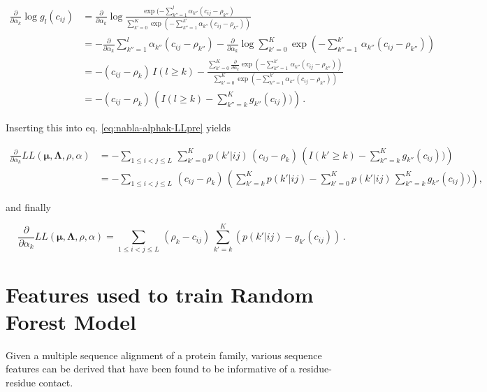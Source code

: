 \documentclass[11pt,a4paper,twoside]{book}
\newcommand{\cij}{c_{ij}}
\theoremstyle{definition}
\theoremstyle{definition}
\theoremstyle{remark}
\begin{document}
\begin{align}
    \frac{\partial} {\partial \alpha_k}  \log g_{l}(\cij)  
    &= \frac{\partial} {\partial \alpha_k}  \log  \frac{\exp (- \sum_{k''=1}^{l} \alpha_{k''} (\cij - \rho_{k''} ) }{ \sum_{k'=0}^K  \exp (- \sum_{k''=1}^{k'} \alpha_{k''} (\cij - \rho_{k''} ) ) } \nonumber \\
    &= -  \frac{\partial} {\partial \alpha_k}  \sum_{k''=1}^{l} \alpha_{k''} (\cij - \rho_{k''} )  
        - \frac{\partial} {\partial \alpha_k}  \log  \sum_{k'=0}^K  \exp \left(- \sum_{k''=1}^{k'} \, \alpha_{k''} (\cij - \rho_{k''} ) \right)  \nonumber \\
    &= - (\cij - \rho_{k} ) \, I(l \ge k) -  \frac{ \sum_{k'=0}^K \frac{\partial} {\partial \alpha_k}  \exp (- \sum_{k''=1}^{k'} \, \alpha_{k''} (\cij - \rho_{k''} ) ) }{ \sum_{k'=0}^K  \exp (- \sum_{k''=1}^{k'} \alpha_{k''} (\cij - \rho_{k''} ) ) } \nonumber \\
    &= - (\cij - \rho_{k} )  \, \left(  I(l \ge k)  -  \sum_{k''=k}^K  g_{k''}(\cij) )  \right)  \, .
    \label{eq:dlog-gk-dalpha}
\end{align}

Inserting this into eq. \eqref{eq:nabla-alphak-LLpre} yields

\begin{align}
    \frac{\partial} {\partial \alpha_k}  L\!L(\mathbf{\mu}, \mathbf{\Lambda}, \rho, \alpha) 
    &= - \sum_{1\le i<j\le L}  \, \sum_{k'=0}^K  p(k'|ij) \, (\cij - \rho_k) \, \left(  I(k' \ge k)  -  \sum_{k''=k}^K  g_{k''}(\cij) )  \right)  \nonumber \\
    &= -\sum_{1\le i<j\le L}  \, (\cij - \rho_k) \, \left( \sum_{k'=k}^K  p(k'|ij)   -  \sum _{k'=0}^K  p(k'|ij) \, \sum_{k''=k}^K  g_{k''}(\cij) )  \right) ,
\end{align}

and finally

\begin{equation}
    \frac{\partial} {\partial \alpha_k}  L\!L(\mathbf{\mu}, \mathbf{\Lambda}, \rho, \alpha)     = \sum_{1\le i<j\le L}  \, (\rho_k - \cij) \, \sum_{k'=k}^K  ( p(k'|ij) -  g_{k'}(\cij) )  \, .
\end{equation}

\section{Features used to train Random Forest Model}\label{seq-features}

Given a multiple sequence alignment of a protein family, various
sequence features can be derived that have been found to be informative
of a residue-residue contact.
\end{document}
